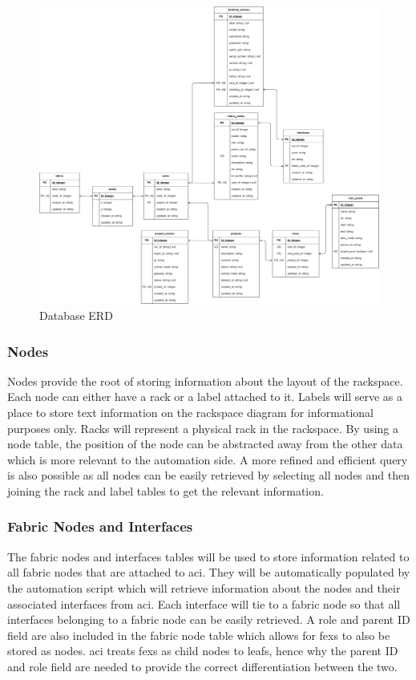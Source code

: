 \begin{figure}[H]
    \centering
    \includegraphics[scale=0.1]{images/erd.png}
    \caption{Database ERD}
    \label{fig:database-erd}
\end{figure}

\subsubsection{Nodes}
\label{design:web-application:database:nodes}
Nodes provide the root of storing information about the layout of the rackspace. Each node can either have a rack or a label attached to it. Labels will serve as a place to store text information on the rackspace diagram for informational purposes only. Racks will represent a physical rack in the rackspace. By using a node table, the position of the node can be abstracted away from the other data which is more relevant to the automation side. A more refined and efficient query is also possible as all nodes can be easily retrieved by selecting all nodes and then joining the rack and label tables to get the relevant information.

\subsubsection{Fabric Nodes and Interfaces}
\label{design:web-application:database:fabric-nodes-and-interfaces}
The fabric nodes and interfaces tables will be used to store information related to all fabric nodes that are attached to \gls{aci}. They will be automatically populated by the automation script which will retrieve information about the nodes and their associated interfaces from \gls{aci}. Each interface will tie to a fabric node so that all interfaces belonging to a fabric node can be easily retrieved. A role and parent ID field are also included in the fabric node table which allows for \gls{fex}s to also be stored as nodes. \gls{aci} treats \gls{fex}s as child nodes to leafs, hence why the parent ID and role field are needed to provide the correct differentiation between the two.

